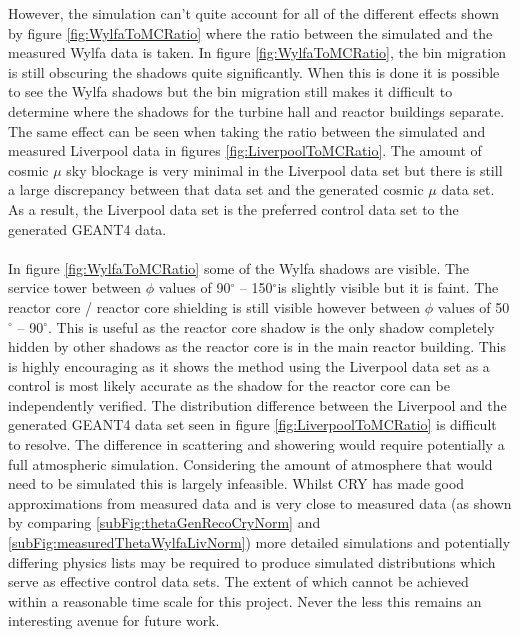 However, the simulation can't quite account for all of the different effects shown by figure \ref{fig:WylfaToMCRatio} where the ratio between the simulated and the measured Wylfa data is taken. In figure \ref{fig:WylfaToMCRatio}, the bin migration is still obscuring the shadows quite significantly. When this is done it is possible to see the Wylfa shadows but the bin migration still makes it difficult to determine where the shadows for the turbine hall and reactor buildings separate. The same effect can be seen when taking the ratio between the simulated and measured Liverpool data in figures \ref{fig:LiverpoolToMCRatio}. The amount of cosmic $\mu$ sky blockage is very minimal in the Liverpool data set but there is still a large discrepancy between that data set and the generated cosmic $\mu$ data set. As a result, the Liverpool data set is the preferred control data set to the generated GEANT4 data. 
\\\\ In figure \ref{fig:WylfaToMCRatio} some of the Wylfa shadows are visible. The service tower between $\phi$ values of 90$^\circ$ -- 150$^\circ$is slightly visible but it is faint. The reactor core / reactor core shielding is still visible however between $\phi$ values of 50$^\circ$ -- 90$^\circ$. This is useful as the reactor core shadow is the only shadow completely hidden by other shadows as the reactor core is in the main reactor building. This is highly encouraging as it shows the method using the Liverpool data set as a control is most likely accurate as the shadow for the reactor core can be independently verified. The distribution difference between the Liverpool and the generated GEANT4 data set seen in figure \ref{fig:LiverpoolToMCRatio} is difficult to resolve. The difference in scattering and showering would require potentially a full atmospheric simulation. Considering the amount of atmosphere that would need to be simulated this is largely infeasible. Whilst CRY has made good approximations from measured data and is very close to measured data (as shown by comparing \ref{subFig:thetaGenRecoCryNorm} and \ref{subFig:measuredThetaWylfaLivNorm}) more detailed simulations and potentially differing physics lists may be required to produce simulated distributions which serve as effective control data sets. The extent of which cannot be achieved within a reasonable time scale for this project. Never the less this remains an interesting avenue for future work. 


